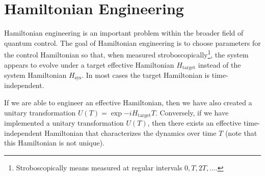 %
%



\section{Hamiltonian Engineering}

Hamiltonian engineering is an important problem within the broader field of quantum control. The goal of Hamiltonian engineering is to choose parameters for the control Hamiltonian so that, when measured stroboscopically\footnote{Stroboscopically means measured at regular intervals $0, T, 2T, \dots$.}, the system appears to evolve under a target effective Hamiltonian $H_{\text{target}}$ instead of the system Hamiltonian $H_{\text{sys}}$. In most cases the target Hamiltonian is time-independent.

If we are able to engineer an effective Hamiltonian, then we have also created a unitary transformation $U(T) = \exp{-i H_{\text{target}} T}$. Conversely, if we have implemented a unitary transformation $U(T)$, then there exists an effective time-independent Hamiltonian that characterizes the dynamics over time $T$ (note that this Hamiltonian is not unique).

